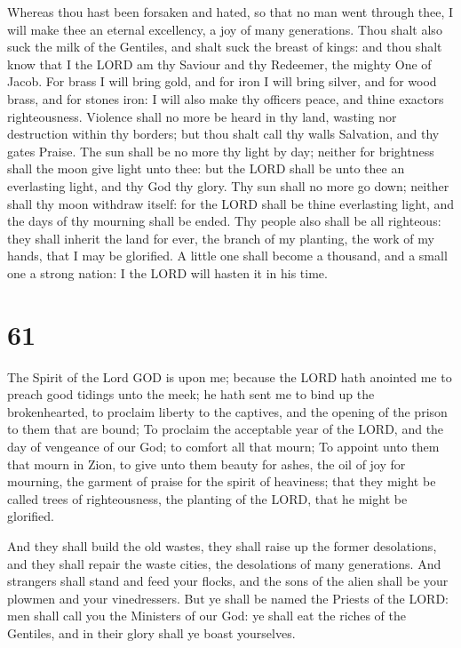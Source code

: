  Whereas thou hast been forsaken and hated, so that no
man went through thee, I will make thee an eternal excellency, a joy of
many generations.  Thou shalt also suck the milk of the
Gentiles, and shalt suck the breast of kings: and thou shalt know that I
the LORD am thy Saviour and thy Redeemer, the mighty One of Jacob.
 For brass I will bring gold, and for iron I will bring
silver, and for wood brass, and for stones iron: I will also make thy
officers peace, and thine exactors righteousness. 
Violence shall no more be heard in thy land, wasting nor destruction
within thy borders; but thou shalt call thy walls Salvation, and thy
gates Praise.  The sun shall be no more thy light by day;
neither for brightness shall the moon give light unto thee: but the LORD
shall be unto thee an everlasting light, and thy God thy glory.
 Thy sun shall no more go down; neither shall thy moon
withdraw itself: for the LORD shall be thine everlasting light, and the
days of thy mourning shall be ended.  Thy people also
shall be all righteous: they shall inherit the land for ever, the branch
of my planting, the work of my hands, that I may be glorified.
 A little one shall become a thousand, and a small one a
strong nation: I the LORD will hasten it in his time.

\hypertarget{section-60}{%
\section{61}\label{section-60}}

 The Spirit of the Lord GOD is upon me; because the LORD
hath anointed me to preach good tidings unto the meek; he hath sent me
to bind up the brokenhearted, to proclaim liberty to the captives, and
the opening of the prison to them that are bound;  To
proclaim the acceptable year of the LORD, and the day of vengeance of
our God; to comfort all that mourn;  To appoint unto them
that mourn in Zion, to give unto them beauty for ashes, the oil of joy
for mourning, the garment of praise for the spirit of heaviness; that
they might be called trees of righteousness, the planting of the LORD,
that he might be glorified.

 And they shall build the old wastes, they shall raise up
the former desolations, and they shall repair the waste cities, the
desolations of many generations.  And strangers shall
stand and feed your flocks, and the sons of the alien shall be your
plowmen and your vinedressers.  But ye shall be named the
Priests of the LORD: men shall call you the Ministers of our God: ye
shall eat the riches of the Gentiles, and in their glory shall ye boast
yourselves.

